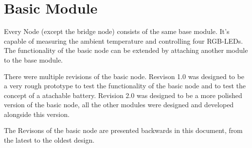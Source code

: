 \section{Basic Module}
Every Node (except the bridge node) consists of the same base module. It's
capable of measuring the ambient temperature and controlling four RGB-LEDs.
The functionality of the basic node can be extended by attaching another
module to the base module. 

There were multiple revisions of the basic node. Resvison 1.0 was designed to
be a very rough prototype to test the functionality of the basic node and to 
test the concept of a atachable battery. Revision 2.0 was designed to be a 
more polished version of the basic node, all the other modules were designed 
and developed alongside this version.

The Revisons of the basic node are presented backwards in this document, from
the latest to the oldest design.




